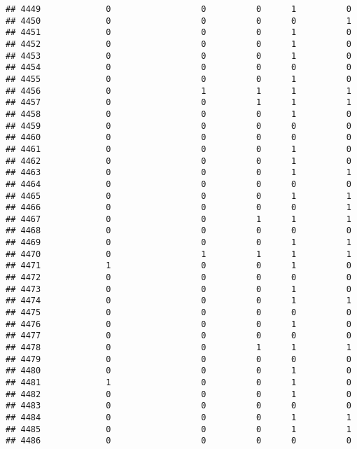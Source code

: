 \documentclass[
]{article}
\begin{document}
\begin{verbatim}
## 4449             0                  0          0      1          0
## 4450             0                  0          0      0          1
## 4451             0                  0          0      1          0
## 4452             0                  0          0      1          0
## 4453             0                  0          0      1          0
## 4454             0                  0          0      0          0
## 4455             0                  0          0      1          0
## 4456             0                  1          1      1          1
## 4457             0                  0          1      1          1
## 4458             0                  0          0      1          0
## 4459             0                  0          0      0          0
## 4460             0                  0          0      0          0
## 4461             0                  0          0      1          0
## 4462             0                  0          0      1          0
## 4463             0                  0          0      1          1
## 4464             0                  0          0      0          0
## 4465             0                  0          0      1          1
## 4466             0                  0          0      0          1
## 4467             0                  0          1      1          1
## 4468             0                  0          0      0          0
## 4469             0                  0          0      1          1
## 4470             0                  1          1      1          1
## 4471             1                  0          0      1          0
## 4472             0                  0          0      0          0
## 4473             0                  0          0      1          0
## 4474             0                  0          0      1          1
## 4475             0                  0          0      0          0
## 4476             0                  0          0      1          0
## 4477             0                  0          0      0          0
## 4478             0                  0          1      1          1
## 4479             0                  0          0      0          0
## 4480             0                  0          0      1          0
## 4481             1                  0          0      1          0
## 4482             0                  0          0      1          0
## 4483             0                  0          0      0          0
## 4484             0                  0          0      1          1
## 4485             0                  0          0      1          1
## 4486             0                  0          0      0          0

\end{verbatim}
\end{document}
